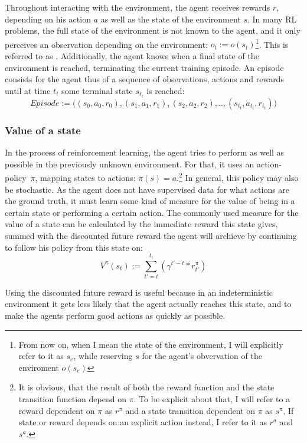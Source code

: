 Throughout interacting with the environment, the agent receives rewards $r$, depending on his action $a$ as well as the state of the environment $s$. In many RL problems, the full state of the environment is not known to the agent, and it only perceives an observation depending on the environment: $o_t := o(s_t)$\footnote{From now on, when I mean the state of the environment, I will explicitly refer to it as $s_e$, while reserving $s$ for the agent's obvervation of the enviroment $o(s_e)$}. This is referred to as . Additionally, the agent knows when a final state of the environment is reached, terminating the current training episode. An episode consists for the agent thus of a sequence of observations, actions and rewards until at time $t_t$ some terminal state $s_{t_t}$ is reached: $$Episode := \big((s_0, a_0, r_0), (s_1, a_1, r_1), (s_2,a_2,r_2), .., (s_{t_t}, a_{t_t}, r_{t_t})\big)$$

\subsubsection{Value of a state}
In the process of reinforcement learning, the agent tries to perform as well as possible in the previously unknown environment. For that, it uses an \mbox{action-policy $\pi$,} mapping states to actions: $\pi(s) = a$.\footnote{It is obvious, that the result of both the reward function and the state transition function depend on $\pi$. To be explicit about that, I will refer to a reward dependent on $\pi$ as $r^\pi$ and a state transition dependent on $\pi$ as $s^\pi$. If state or reward depends on an explicit action instead, I refer to it as $r^a$ and $s^a$.}  In general, this policy may also be stochastic. As the agent does not have supervised data for what actions are the ground truth, it must learn some kind of measure for the value of being in a certain state or performing a certain action. The commonly used measure for the value of a state can be calculated by the immediate reward this state gives, summed with the discounted future reward the agent will archieve by continuing to follow his policy from this state on: 
\begin{equation} \label{eq:1.1}
	V^\pi(s_t) := \sum_{t'=t}^{t_t} ( \gamma^{t'-t} * r^\pi_{t'} )
\end{equation}

Using the discounted future reward is useful because in an indeterministic environment it gets less likely that the agent actually reaches this state, and to make the agents perform good actions as quickly as possible.

